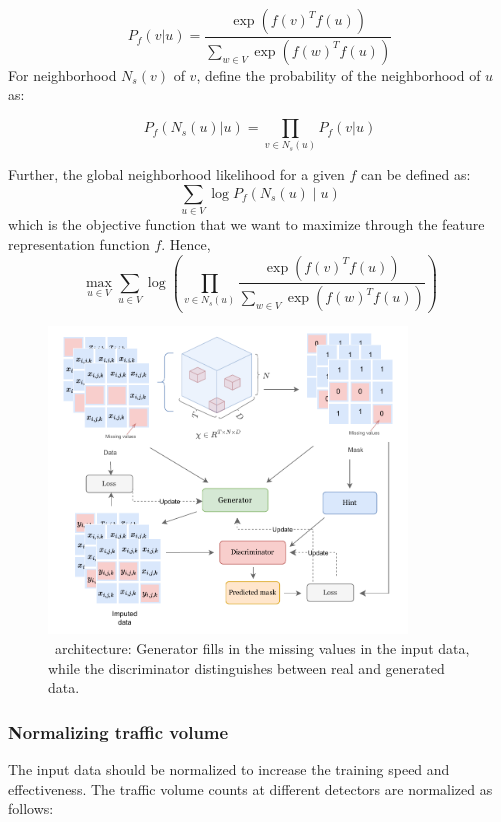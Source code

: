 \begin{enumerate}[(i)]
    \[
        P_f(v|u) = \frac{\exp(f(v)^T f(u))}{\sum_{w \in V} \exp(f(w)^T f(u))} \tag{1}
    \]
    For neighborhood \( N_s(v) \) of \( v \), define the probability of the neighborhood of \( u \) as:
    
    \[ P_f(N_s(u)|u) = \prod_{v \in N_s(u)} P_f(v|u) \tag{2} \]

    Further, the global neighborhood likelihood for a given \( f \) can be defined as:
\[ \sum_{u \in V} \log P_f(N_s(u) \mid u) \tag{3} \]
which is the objective function that we want to maximize through the feature representation function \(f\). Hence,
\[ \max_{u \in V} \sum_{u \in V} \log \left( \prod_{v \in N_s(u)} \frac{\exp(f(v)^T f(u))}{\sum_{w \in V} \exp(f(w)^T f(u))} \right) \tag{4} \]

\end{enumerate}

\begin{figure}[htbp]
  \centering
  \includegraphics[width=0.85\textwidth]{model.pdf}
  \caption{\name \ architecture: Generator fills in the missing values in the input data, while the discriminator distinguishes between real and generated data.}
  \label{fig:architecture}
\end{figure}

\subsubsection{Normalizing traffic volume}\label{subsubsec:normal}
The input data should be normalized to increase the training speed and effectiveness. The traffic volume counts at different detectors are normalized as follows:


